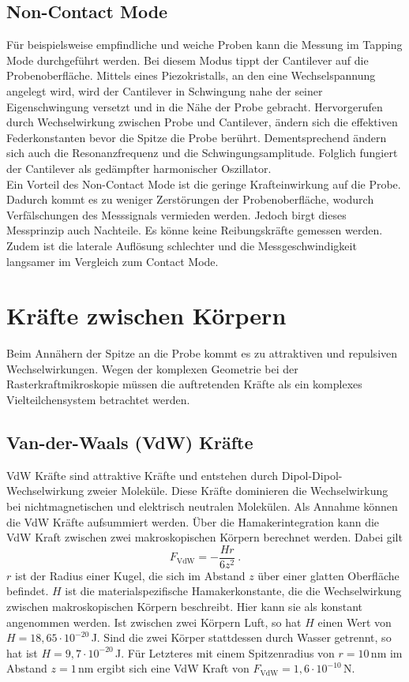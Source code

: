 \subsection{Non-Contact Mode}
Für beispielsweise empfindliche und weiche Proben kann die Messung im Tapping Mode durchgeführt werden. Bei diesem Modus tippt der Cantilever auf die Probenoberfläche. Mittels eines Piezokristalls, an den eine Wechselspannung angelegt wird, wird der Cantilever in Schwingung nahe der seiner Eigenschwingung versetzt und in die Nähe der Probe gebracht. Hervorgerufen durch Wechselwirkung zwischen Probe und Cantilever, ändern sich die effektiven Federkonstanten bevor die Spitze die Probe berührt. Dementsprechend ändern sich auch die Resonanzfrequenz und die Schwingungsamplitude. Folglich fungiert der Cantilever als gedämpfter harmonischer Oszillator.\\
Ein Vorteil des Non-Contact Mode ist die geringe Krafteinwirkung auf die Probe. Dadurch kommt es zu weniger Zerstörungen der Probenoberfläche, wodurch Verfälschungen des Messsignals vermieden werden. Jedoch birgt dieses Messprinzip auch Nachteile. Es könne keine Reibungskräfte gemessen werden. Zudem ist die laterale Auflösung schlechter und die Messgeschwindigkeit langsamer im Vergleich zum Contact Mode.


\section{Kräfte zwischen Körpern}
Beim Annähern der Spitze an die Probe kommt es zu attraktiven und repulsiven Wechselwirkungen. Wegen der komplexen Geometrie bei der Rasterkraftmikroskopie müssen die auftretenden Kräfte als ein komplexes Vielteilchensystem betrachtet werden. 

\subsection{Van-der-Waals (VdW) Kräfte}
VdW Kräfte sind attraktive Kräfte und entstehen durch Dipol-Dipol-Wechselwirkung zweier Moleküle. Diese Kräfte dominieren die Wechselwirkung bei nichtmagnetischen und elektrisch neutralen Molekülen. Als Annahme können die VdW Kräfte aufsummiert werden. Über die Hamakerintegration kann die VdW Kraft zwischen zwei makroskopischen Körpern berechnet werden. Dabei gilt
$$F_\text{VdW}=-\frac{Hr}{6z^{2}}~.$$
$r$ ist der Radius einer Kugel, die sich im Abstand $z$ über einer glatten Oberfläche befindet. $H$ ist die materialspezifische Hamakerkonstante, die die Wechselwirkung zwischen makroskopischen Körpern beschreibt. Hier kann sie als konstant angenommen werden. Ist zwischen zwei Körpern Luft, so hat $H$ einen Wert von $H=18,65 \cdot 10^{-20}\,$J. Sind die zwei Körper stattdessen durch Wasser getrennt, so hat ist $H=9,7 \cdot 10^{-20}\,$J. Für Letzteres mit einem Spitzenradius von $r=10\,$nm im Abstand $z=1\,$nm ergibt sich eine VdW Kraft von $F_\text{VdW}=1,6 \cdot 10^{-10}\,$N.

